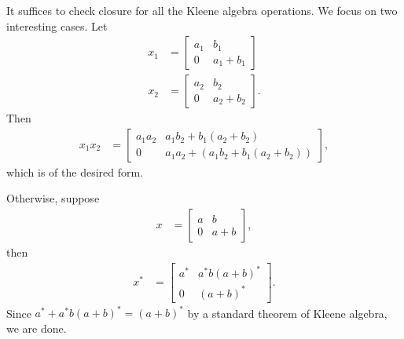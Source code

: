 \documentclass[a4paper,UKenglish,cleveref, autoref, thm-restate]{lipics-v2021}
\begin{document}
\begin{proofEnd}
  It suffices to check closure for all the Kleene algebra operations.
  We focus on two interesting cases.  Let
  \begin{align*}
    x_1 & =
          \begin{bmatrix}
            a_1 & b_1 \\
            0 & a_1 + b_1
          \end{bmatrix} \\
    x_2 & =
          \begin{bmatrix}
            a_2 & b_2 \\
            0 & a_2 + b_2
          \end{bmatrix}.
  \end{align*}
  Then
  \begin{align*}
    x_1x_2
    & =
      \begin{bmatrix}
        a_1a_2 & a_1b_2 + b_1 (a_2+b_2) \\
        0 & a_1a_2 + (a_1b_2 + b_1(a_2+b_2))
      \end{bmatrix},
  \end{align*}
  which is of the desired form.

  Otherwise, suppose
  \begin{align*}
    x
    & =
      \begin{bmatrix}
        a & b \\
        0 & a + b
      \end{bmatrix},
  \end{align*}
  then
  \begin{align*}
    x^* & =
          \begin{bmatrix}
            a^* & a^*b(a+b)^* \\
            0 & (a+b)^*
          \end{bmatrix}.
  \end{align*}
  Since $a^* + a^*b(a+b)^* = (a+b)^*$ by a standard theorem of Kleene algebra,
  we are done.
\end{proofEnd}
\end{document}

